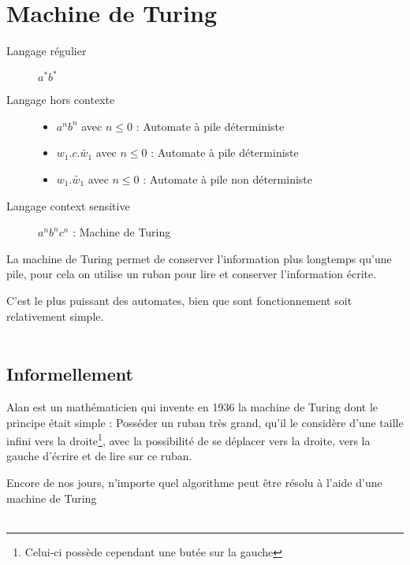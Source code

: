 \chapter{Machine de Turing}
\begin{description}
	\item[Langage régulier] $a^*b^*$
	\item[Langage hors contexte] 
		\begin{itemize}
			\item $a^nb^n$ avec $n\leq 0$ : Automate à pile déterministe
			\item $w_1.c.\widetilde{w_1}$ avec $n\leq 0$ : Automate à pile déterministe
			\item $w_1.\widetilde{w_1}$ avec $n\leq 0$ : Automate à pile non déterministe
		\end{itemize}
	\item[Langage context sensitive] $a^nb^nc^n$ : Machine de Turing
\end{description}
La machine de Turing permet de conserver l'information plus longtemps qu'une pile, pour cela on utilise un ruban pour lire et conserver l'information écrite.

\begin{remarque}
C'est le plus puissant des automates, bien que sont fonctionnement soit relativement simple.\\~
\end{remarque}

\section{Informellement}
Alan  est un mathématicien qui invente en 1936 la machine de Turing dont le principe était simple : Posséder un ruban très grand, qu'il le
considère d'une taille infini vers la droite\footnote{Celui-ci possède cependant une butée sur la gauche}, avec la possibilité de se déplacer vers la
droite, vers la gauche d'écrire et de lire sur ce ruban.

\begin{remarque}
	Encore de nos jours, n'importe quel algorithme peut être résolu à l'aide d'une machine de Turing\\~
\end{remarque}
